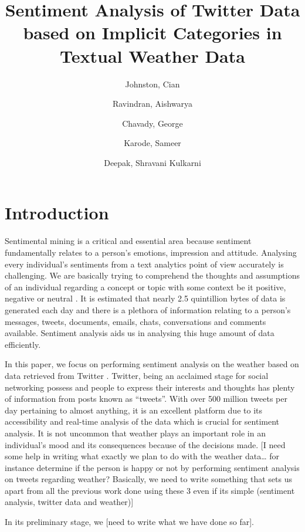 \documentclass[a4paper,10pt]{article}
\begin{document}
\title{Sentiment Analysis of Twitter Data based on Implicit Categories in Textual Weather Data}
\author{
    Johnston, Cian
    \and
    Ravindran, Aishwarya
    \and
    Chavady, George
    \and
    Karode, Sameer
    \and
    Deepak, Shravani Kulkarni
}

\maketitle
\section{Introduction}

Sentimental mining is a critical and essential area because sentiment fundamentally relates to a person’s emotions, impression and attitude. Analysing every individual’s sentiments from a text analytics point of view accurately is challenging. We are basically trying to comprehend the thoughts and assumptions of an individual regarding a concept or topic with some context be it positive, negative or neutral . It is estimated that nearly 2.5 quintillion bytes of data is generated each day  and there is a plethora of information relating to a person’s messages, tweets, documents, emails, chats, conversations and comments available. Sentiment analysis aids us in analysing this huge amount of data efficiently.

In this paper, we focus on performing sentiment analysis on the weather based on data retrieved from Twitter . Twitter, being an acclaimed stage for social networking possess and people to express their interests and thoughts has plenty of information from posts known as “tweets”. With over 500 million tweets per day pertaining to almost anything, it is an excellent platform due to its accessibility and real-time analysis of the data which is crucial for sentiment analysis. It is not uncommon that weather plays an important role in an individual’s mood and its consequences because of the decisions made. [I need some help in writing what exactly we plan to do with the weather data… for instance determine if the person is happy or not by performing sentiment analysis on tweets regarding weather? Basically, we need to write something that sets us apart from all the previous work done using these 3 even if its simple (sentiment analysis, twitter data and weather)] 

In its preliminary stage, we [need to write what we have done so far].
\end{document}

